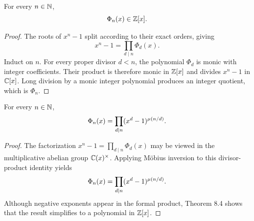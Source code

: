 \begin{thm}
For every $n\in\mathbb{N}$,
\[
 \Phi_n(x)\in\mathbb{Z}[x].
\]
\end{thm}
\begin{proof}
The roots of $x^n-1$ split according to their exact orders, giving
\[
 x^n-1=\prod_{d\mid n}\Phi_d(x).
\]
Induct on $n$.  For every proper divisor $d<n$, the polynomial $\Phi_d$ is monic with integer coefficients.  Their product is therefore monic in $\mathbb{Z}[x]$ and divides $x^n-1$ in $\mathbb{C}[x]$.  Long division by a monic integer polynomial produces an integer quotient, which is $\Phi_n$.
\end{proof}

\begin{thm}
For every $n\in\mathbb{N}$,
\[
 \Phi_n(x)=\prod_{d\mid n}(x^d-1)^{\mu(n/d)}.
\]
\end{thm}
\begin{proof}
The factorization
$x^n-1=\prod_{d\mid n}\Phi_d(x)$
may be viewed in the multiplicative abelian group $\mathbb{C}(x)^\times$.  Applying M\"obius inversion to this divisor-product identity yields
\[
 \Phi_n(x)=\prod_{d\mid n}(x^d-1)^{\mu(n/d)}.
\]
Although negative exponents appear in the formal product, Theorem 8.4 shows that the result simplifies to a polynomial in $\mathbb{Z}[x]$.
\end{proof}
